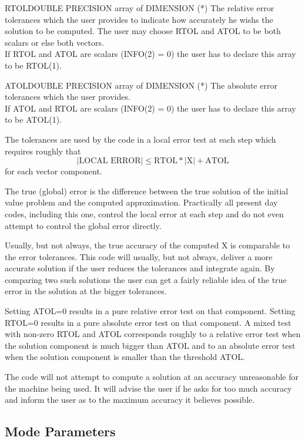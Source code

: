 \begin{entry}{RTOL}{DOUBLE PRECISION array of DIMENSION (*)}
  The relative error tolerances which the user provides to indicate how
  accurately he wishs the solution to be computed. The user may choose RTOL
  and ATOL to be both scalars or else both vectors.\\
  If RTOL and ATOL are scalars (INFO(2) = 0) the user has to declare this
  array to be RTOL(1).
\end{entry}
\begin{entry}{ATOL}{DOUBLE PRECISION array of DIMENSION (*)}
  The absolute error tolerances which the user provides.\\
  If ATOL and RTOL are scalars (INFO(2) = 0) the user has to declare
  this array to be ATOL(1).

  The tolerances are used by the code in a local error test at each
  step which requires roughly that
  $$ | \mbox{LOCAL ERROR} | \le \mbox{RTOL}* |\mbox{X}|+\mbox{ATOL}$$
  for each vector component.

  The true (global) error is the difference between the true solution
  of the initial value problem and the computed approximation.
  Practically all present day codes, including this one, control the
  local error at each step and do not even attempt to control the
  global error directly.

  Usually, but not always, the true accuracy of the computed X is
  comparable to the error tolerances. This code will usually, but not
  always, deliver a more accurate solution if the user reduces the
  tolerances and  integrate again.  By comparing two such solutions
  the user can get a fairly reliable idea of the true error in the solution
  at the bigger tolerances.

  Setting ATOL=0 results in a pure relative error test on that
  component. Setting RTOL=0 results in a pure absolute error test on
  that component. A mixed test with non-zero RTOL and ATOL corresponds
  roughly to a relative error test when the solution component is much
  bigger than ATOL and to an absolute error test when the solution
  component is smaller than the threshold ATOL.

  The code will not attempt to compute a solution at an accuracy
  unreasonable for the machine being used. It will advise the user if he
  asks for too much accuracy and inform the user as to the maximum accuracy
  it believes possible.
\end{entry}

\subsection{Mode Parameters}

